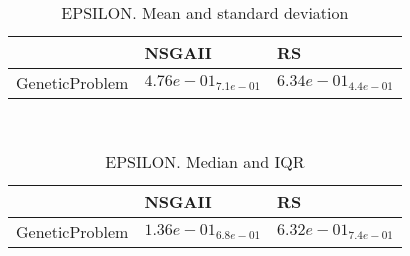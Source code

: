 \documentclass{article}
\begin{document}
\
\begin{table}
\caption{EPSILON. Mean and standard deviation}
\label{table:mean.EPSILON}
\centering
\begin{scriptsize}
\begin{tabular}{lll}
\hline & NSGAII &  RS\\
\hline
GeneticProblem & \cellcolor{gray95}$  4.76e-01_{ 7.1e-01}$ & $  6.34e-01_{ 4.4e-01}$ \\
\hline
\end{tabular}
\end{scriptsize}
\end{table}
\
\begin{table}
\caption{EPSILON. Median and IQR}
\label{table:median.EPSILON}
\begin{scriptsize}
\centering
\begin{tabular}{lll}
\hline & NSGAII &  RS\\
\hline
GeneticProblem & \cellcolor{gray95}$  1.36e-01_{ 6.8e-01}$ & $  6.32e-01_{ 7.4e-01}$ \\
\hline
\end{tabular}
\end{scriptsize}
\end{table}
\end{document}
